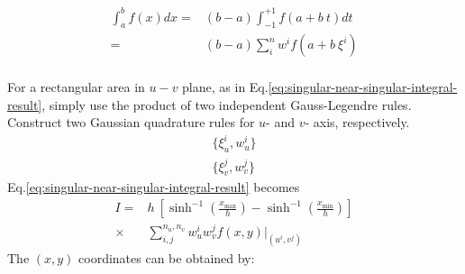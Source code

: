\documentclass [10pt,letterpaper]{article}
\begin{document}
\begin{equation} \label{eq:singular-near-singular-general-1D-quadrature}
	\begin{split} 
		\int \nolimits_{a}^{b}
		f(x)
		dx
		=& 
		(b-a)
		\int \nolimits_{-1}^{+1} 
		f(a+b\ t)
		dt
		\\
		=&
		(b-a)
		\sum \limits_{i}^{n}
		w^i
		f(a+b\ \xi^i)
	\end{split}
\end{equation}
\\
For a rectangular area in $u-v$ plane, 
as in Eq.\eqref{eq:singular-near-singular-integral-result},
simply use the product of two independent Gauss-Legendre rules.
Construct two Gaussian quadrature rules for $u$- and $v$- axis, respectively.
\begin{equation} \label{eq:singular-near-singular-xiu-xiv}
	\begin{split} 
		\{ \xi_u^i, w_u^i \}
		\\
		\{ \xi_v^j, w_v^j \}
	\end{split}
\end{equation}
Eq.\eqref{eq:singular-near-singular-integral-result} becomes
\begin{equation} \label{eq:singular-near-singular-general-quadrature}
	\begin{split} 
		I
		=&
		h
		\ [
			\sinh^{-1}(\frac{x_{\max}}{h})
			-
			\sinh^{-1}(\frac{x_{\min}}{h})
		]
		\\
		\times
		&
		\sum \nolimits_{i,j}^{n_u,n_v} 
		w_u^i w_v^j
		f(x,y)
		\big\vert
		_{ (u^i,v^j) }
	\end{split}
\end{equation}
The $(x,y)$ coordinates can be obtained by:
\end{document}
